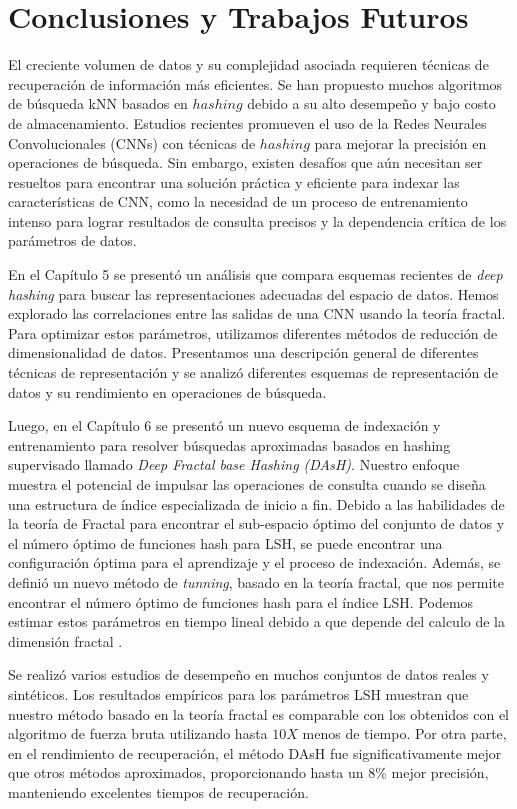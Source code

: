\chapter{Conclusiones y Trabajos Futuros}
 
El creciente volumen de datos y su complejidad asociada requieren técnicas de recuperación de información   más eficientes. Se han propuesto muchos algoritmos de búsqueda kNN basados  en  $hashing$  debido a su alto desempeño  y bajo costo de almacenamiento. Estudios recientes promueven el uso de la Redes Neurales Convolucionales (CNNs) con técnicas de $hashing$ para mejorar la precisión en operaciones de búsqueda. Sin embargo, existen desafíos que aún necesitan ser resueltos   para encontrar una solución práctica y eficiente para indexar las características de CNN, como la necesidad de un proceso de entrenamiento intenso para lograr resultados de consulta precisos y la dependencia crítica de los parámetros de datos.

En el Capítulo 5 se presentó un análisis  que compara esquemas recientes de \textit{deep hashing} para  buscar las   representaciones adecuadas del espacio de datos. Hemos explorado las correlaciones entre las salidas de una CNN usando la teoría fractal. Para optimizar estos parámetros, utilizamos diferentes métodos de reducción de dimensionalidad de datos. Presentamos una descripción general de  diferentes técnicas de representación y se analizó  diferentes esquemas  de representación de datos y  su rendimiento en operaciones de búsqueda. 

Luego, en el Capítulo 6  se presentó  un nuevo esquema de indexación y entrenamiento para resolver   búsquedas aproximadas  basados en  hashing supervisado llamado \textit{Deep Fractal base Hashing (DAsH)}. Nuestro enfoque muestra el potencial de impulsar las operaciones de consulta cuando se diseña una estructura de índice especializada de inicio a fin. Debido a las habilidades de la teoría de Fractal para encontrar el sub-espacio óptimo del conjunto de datos y el número óptimo de funciones hash para LSH, se puede encontrar una configuración óptima para el aprendizaje y el proceso de indexación. Además, se definió  un nuevo método de \textit{tunning}, basado en la teoría fractal, que nos permite encontrar el número óptimo de funciones hash para el índice LSH. Podemos estimar estos parámetros en tiempo lineal debido a que depende del calculo de la dimensión fractal .

Se realizó varios  estudios de desempeño en muchos conjuntos de datos reales y sintéticos. Los resultados empíricos para los parámetros LSH muestran que nuestro método basado en la teoría fractal es comparable con los obtenidos con el algoritmo de fuerza bruta utilizando hasta $10X$ menos de tiempo. Por otra parte, en el rendimiento de recuperación, el método DAsH fue significativamente mejor que otros métodos aproximados, proporcionando hasta un 8\% mejor precisión, manteniendo excelentes tiempos de recuperación.


